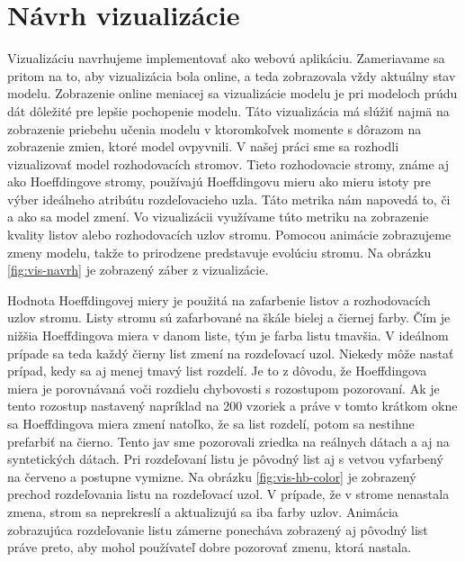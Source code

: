 \section{Návrh vizualizácie}
\label{navrh-vizualizacie}
Vizualizáciu navrhujeme implementovať ako webovú aplikáciu. Zameriavame sa pritom na to, aby vizualizácia bola online, a teda zobrazovala vždy aktuálny stav modelu. Zobrazenie online meniacej sa vizualizácie modelu je pri modeloch prúdu dát dôležité pre lepšie pochopenie modelu. Táto vizualizácia má slúžiť najmä na zobrazenie priebehu učenia modelu v ktoromkoľvek momente s dôrazom na zobrazenie zmien, ktoré model ovpyvnili. V našej práci sme sa rozhodli vizualizovať model rozhodovacích stromov. Tieto rozhodovacie stromy, známe aj ako Hoeffdingove stromy, používajú Hoeffdingovu mieru ako mieru istoty pre výber ideálneho atribútu rozdeľovacieho uzla. Táto metrika nám napovedá to, či a ako sa model zmení. Vo vizualizácii využívame túto metriku na zobrazenie kvality listov alebo rozhodovacích uzlov stromu. Pomocou animácie zobrazujeme zmeny modelu, takže to prirodzene predstavuje evolúciu stromu. Na obrázku \ref{fig:vis-navrh} je zobrazený záber z vizualizácie.
\label{fig:vis-navrh}
\par
Hodnota Hoeffdingovej miery je použitá na zafarbenie listov a rozhodovacích uzlov stromu. Listy stromu sú zafarbované na škále bielej a čiernej farby. Čím je nižšia Hoeffdingova miera v danom liste, tým je farba listu tmavšia. V ideálnom prípade sa teda každý čierny list zmení na rozdeľovací uzol. Niekedy môže nastať prípad, kedy sa aj menej tmavý list rozdelí. Je to z dôvodu, že Hoeffdingova miera je porovnávaná voči rozdielu chybovosti s rozostupom pozorovaní. Ak je tento rozostup nastavený napríklad na 200 vzoriek a práve v tomto krátkom okne sa Hoeffdingova miera zmení natoľko, že sa list rozdelí, potom sa nestihne prefarbiť na čierno. Tento jav sme pozorovali zriedka na reálnych dátach a aj na syntetických dátach. Pri rozdeľovaní listu je pôvodný list aj s vetvou vyfarbený na červeno a postupne vymizne. Na obrázku \ref{fig:vis-hb-color} je zobrazený prechod rozdeľovania listu na rozdeľovací uzol. V prípade, že v strome nenastala zmena, strom sa neprekreslí a aktualizujú sa iba farby uzlov. Animácia zobrazujúca rozdeľovanie listu zámerne ponecháva zobrazený aj pôvodný list práve preto, aby mohol používateľ dobre pozorovať zmenu, ktorá nastala.
